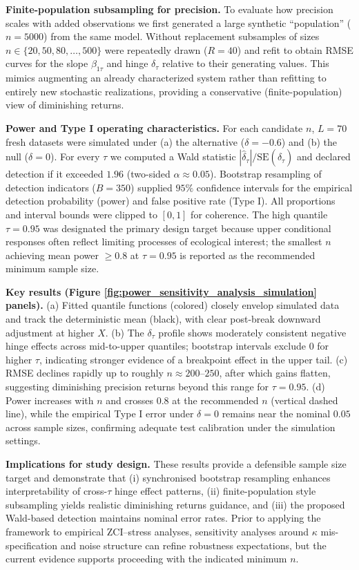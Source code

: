 \textbf{Finite-population subsampling for precision.} To evaluate how precision scales with added observations we first generated a large synthetic ``population'' ($n=5000$) from the same model. Without replacement subsamples of sizes $n \in \{20, 50, 80, \ldots, 500\}$ were repeatedly drawn ($R=40$) and refit to obtain RMSE curves for the slope $\beta_{1\tau}$ and hinge $\delta_\tau$ relative to their generating values. This mimics augmenting an already characterized system rather than refitting to entirely new stochastic realizations, providing a conservative (finite-population) view of diminishing returns.

\textbf{Power and Type I operating characteristics.} For each candidate $n$, $L=70$ fresh datasets were simulated under (a) the alternative ($\delta = -0.6$) and (b) the null ($\delta = 0$). For every $\tau$ we computed a Wald statistic $|\hat{\delta}_\tau|/\text{SE}(\hat{\delta}_\tau)$ and declared detection if it exceeded $1.96$ (two-sided $\alpha \approx 0.05$). Bootstrap resampling of detection indicators ($B=350$) supplied $95\%$ confidence intervals for the empirical detection probability (power) and false positive rate (Type I). All proportions and interval bounds were clipped to $[0,1]$ for coherence. The high quantile $\tau=0.95$ was designated the primary design target because upper conditional responses often reflect limiting processes of ecological interest; the smallest $n$ achieving mean power $\geq 0.8$ at $\tau=0.95$ is reported as the recommended minimum sample size.

\textbf{Key results (Figure \textcolor{blue}{\ref{fig:power_sensitivity_analysis_simulation}} panels).}
(a) Fitted quantile functions (colored) closely envelop simulated data and track the deterministic mean (black), with clear post-break downward adjustment at higher $X$. (b) The $\delta_\tau$ profile shows moderately consistent negative hinge effects across mid-to-upper quantiles; bootstrap intervals exclude $0$ for higher $\tau$, indicating stronger evidence of a breakpoint effect in the upper tail. (c) RMSE declines rapidly up to roughly $n \approx 200$--$250$, after which gains flatten, suggesting diminishing precision returns beyond this range for $\tau=0.95$. (d) Power increases with $n$ and crosses $0.8$ at the recommended $n$ (vertical dashed line), while the empirical Type I error under $\delta=0$ remains near the nominal $0.05$ across sample sizes, confirming adequate test calibration under the simulation settings.

\textbf{Implications for study design.} These results provide a defensible sample size target and demonstrate that (i) synchronised bootstrap resampling enhances interpretability of cross-$\tau$ hinge effect patterns, (ii) finite-population style subsampling yields realistic diminishing returns guidance, and (iii) the proposed Wald-based detection maintains nominal error rates. Prior to applying the framework to empirical ZCI--stress analyses, sensitivity analyses around $\kappa$ mis-specification and noise structure can refine robustness expectations, but the current evidence supports proceeding with the indicated minimum $n$.


